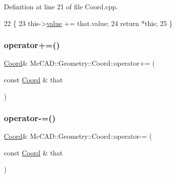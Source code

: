Definition at line 21 of file Coord.\+cpp.


\begin{DoxyCode}
22                           \{
23     this->\hyperlink{classMcCAD_1_1Geometry_1_1Coord_a540aea93d3b1a9cfd505e1e0b96b2b91}{value} += that.value;
24     \textcolor{keywordflow}{return} *\textcolor{keyword}{this};
25 \}
\end{DoxyCode}
\mbox{\label{classMcCAD_1_1Geometry_1_1Coord_ad3d131ab3815b8327914f30aa56020db}} 
\subsubsection{\texorpdfstring{operator+=()}{operator+=()}\hspace{0.1cm}{\footnotesize\ttfamily [2/2]}}
{\footnotesize\ttfamily \hyperlink{classMcCAD_1_1Geometry_1_1Coord}{Coord}\& Mc\+C\+A\+D\+::\+Geometry\+::\+Coord\+::operator+= (\begin{DoxyParamCaption}\item[{const \hyperlink{classMcCAD_1_1Geometry_1_1Coord}{Coord} \&}]{that }\end{DoxyParamCaption})}

\mbox{\label{classMcCAD_1_1Geometry_1_1Coord_a313bf70626441746f74943ff8164df03}} 
\subsubsection{\texorpdfstring{operator-\/=()}{operator-=()}\hspace{0.1cm}{\footnotesize\ttfamily [1/2]}}
{\footnotesize\ttfamily \hyperlink{classMcCAD_1_1Geometry_1_1Coord}{Coord}\& Mc\+C\+A\+D\+::\+Geometry\+::\+Coord\+::operator-\/= (\begin{DoxyParamCaption}\item[{const \hyperlink{classMcCAD_1_1Geometry_1_1Coord}{Coord} \&}]{that }\end{DoxyParamCaption})}

